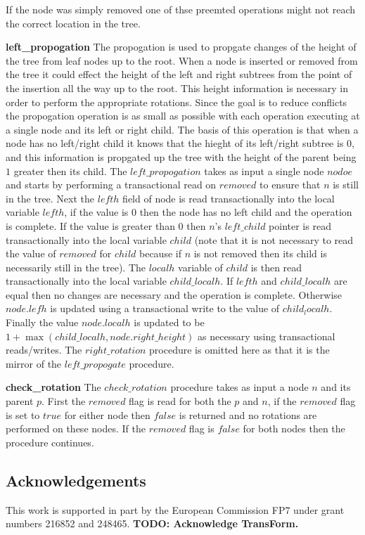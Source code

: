 \documentclass[10pt]{sigplanconf}
\begin{document}
If the node was simply removed one of thse preemted operations might not reach the correct location in the tree. 

{\bf left\_propogation} The propogation is used to propgate changes of the height of the tree from leaf nodes up to the root.
When a node is inserted or removed from the tree it could effect the height of the left and right subtrees from the point of the insertion all the way up to the root.
This height information is necessary in order to perform the appropriate rotations.
Since the goal is to reduce conflicts the propogation operation is as small as possible with each operation executing at a single node and its left or right child.
The basis of this operation is that when a node has no left/right child it knows that the hieght of its left/right subtree is $0$, and this information is propgated up the tree with the height of the parent being $1$ greater then its child.
The $left\_propogation$ takes as input a single node $nodoe$ and starts by performing a transactional read on $removed$ to ensure that $n$ is still in the tree.
Next the $lefth$ field of node is read transactionally into the local variable $lefth$, if the value is $0$ then the node has no left child and the operation is complete.
If the value is greater than $0$ then $n$'s $left\_child$ pointer is read transactionally into the local variable $child$ (note that it is not necessary to read the value of $removed$ for $child$ because if $n$ is not removed then its child is necessarily still in the tree).
The $localh$ variable of $child$ is then read transactionally into the local variable $child\_localh$.
If $lefth$ and $child\_localh$ are equal then no changes are necessary and the operation is complete.
Otherwise $node.lefh$ is updated using a transactional write to the value of $child_localh$.
Finally the value $node.localh$ is updated to be $1 + \max(child\_localh, node.right\_height)$ as necessary using transactional reads/writes.
The $right\_rotation$ procedure is omitted here as that it is the mirror of the $left\_propogate$ procedure.

{\bf check\_rotation} The $check\_rotation$ procedure takes as input a node $n$ and its parent $p$.
First the $removed$ flag is read for both the $p$ and $n$, if the $removed$ flag is set to $true$ for either node then $false$ is returned and no rotations are performed on these nodes.
If the $removed$ flag is $false$ for both nodes then the procedure continues.


\subsection*{Acknowledgements}
This work is supported in part by the European Commission FP7 under grant numbers 216852 and 248465.
{\bf TODO: Acknowledge TransForm.}




\end{document}
